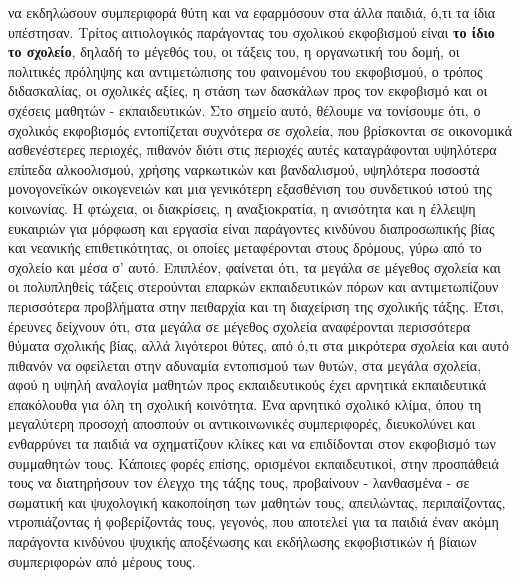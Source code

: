 \documentclass[12pt,a4paper]{book}
\begin{document}
να εκδηλώσουν συμπεριφορά θύτη και να εφαρμόσουν στα άλλα παιδιά, ό,τι τα ίδια
υπέστησαν.
\newline\setlength{\parindent}{40pt}\indent Τρίτος αιτιολογικός παράγοντας του
σχολικού εκφοβισμού είναι \textbf{το ίδιο το σχολείο}, δηλαδή το μέγεθός του, οι
τάξεις του, η οργανωτική του δομή, οι πολιτικές πρόληψης και αντιμετώπισης του
φαινομένου του εκφοβισμού, ο τρόπος διδασκαλίας, οι σχολικές αξίες, η στάση των
δασκάλων προς τον εκφοβισμό και οι σχέσεις μαθητών - εκπαιδευτικών.
\newline\setlength{\parindent}{40pt}\indent Στο σημείο αυτό, θέλουμε να
τονίσουμε ότι, ο σχολικός εκφοβισμός εντοπίζεται συχνότερα σε σχολεία, που
βρίσκονται σε οικονομικά ασθενέστερες περιοχές, πιθανόν διότι στις περιοχές
αυτές καταγράφονται υψηλότερα επίπεδα αλκοολισμού, χρήσης ναρκωτικών και
βανδαλισμού, υψηλότερα ποσοστά μονογονεϊκών οικογενειών και μια  γενικότερη
εξασθένιση του συνδετικού ιστού της κοινωνίας. Η φτώχεια, οι διακρίσεις, η
αναξιοκρατία, η ανισότητα και η έλλειψη ευκαιριών για μόρφωση και εργασία είναι
παράγοντες κινδύνου διαπροσωπικής βίας και νεανικής επιθετικότητας, οι οποίες
μεταφέρονται στους δρόμους, γύρω από το σχολείο και μέσα σ' αυτό.
\newline\setlength{\parindent}{40pt}\indent Επιπλέον, φαίνεται ότι, τα μεγάλα σε
μέγεθος σχολεία και οι πολυπληθείς τάξεις στερούνται επαρκών εκπαιδευτικών πόρων
και αντιμετωπίζουν περισσότερα προβλήματα στην πειθαρχία και τη διαχείριση της
σχολικής τάξης. Έτσι, έρευνες δείχνουν ότι, στα μεγάλα σε μέγεθος σχολεία
αναφέρονται περισσότερα θύματα σχολικής βίας, αλλά λιγότεροι θύτες, από ό,τι στα
μικρότερα σχολεία και αυτό πιθανόν να οφείλεται στην αδυναμία εντοπισμού των
θυτών, στα μεγάλα σχολεία, αφού η υψηλή αναλογία μαθητών προς εκπαιδευτικούς
έχει αρνητικά εκπαιδευτικά επακόλουθα για όλη τη σχολική κοινότητα. Ένα
αρνητικό σχολικό κλίμα, όπου τη μεγαλύτερη προσοχή αποσπούν οι αντικοινωνικές
συμπεριφορές, διευκολύνει και ενθαρρύνει τα παιδιά να σχηματίζουν κλίκες και να
επιδίδονται στον εκφοβισμό των συμμαθητών τους.
\newline\setlength{\parindent}{40pt}\indent Κάποιες φορές επίσης, ορισμένοι
εκπαιδευτικοί, στην προσπάθειά τους να διατηρήσουν τον έλεγχο της τάξης τους,
προβαίνουν - λανθασμένα - σε σωματική και ψυχολογική κακοποίηση των μαθητών
τους, απειλώντας, περιπαίζοντας, ντροπιάζοντας ή φοβερίζοντάς τους, γεγονός, που
αποτελεί για τα παιδιά έναν ακόμη παράγοντα κινδύνου ψυχικής αποξένωσης και
εκδήλωσης εκφοβιστικών ή βίαιων συμπεριφορών από μέρους τους.
\end{document}
